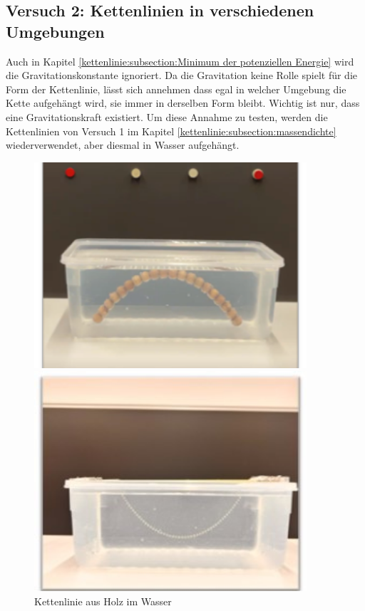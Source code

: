 \subsection{Versuch 2: Kettenlinien in verschiedenen Umgebungen
\label{kettenlinie:subsection:umgebung}}
Auch in Kapitel \ref{kettenlinie:subsection:Minimum der potenziellen Energie} wird die Gravitationskonstante ignoriert.
Da die Gravitation keine Rolle spielt für die Form der Kettenlinie, lässt sich annehmen dass egal in welcher Umgebung die Kette aufgehängt wird, sie immer in derselben Form bleibt.
Wichtig ist nur, dass eine Gravitationskraft existiert.
Um diese Annahme zu testen, werden die Kettenlinien von Versuch 1 im Kapitel \ref{kettenlinie:subsection:massendichte} wiederverwendet, aber diesmal in Wasser aufgehängt.

\begin{figure}
	\centering
	\begin{minipage}{0.45\textwidth}
		\centering
		\includegraphics[width=0.9\textwidth]{papers/kettenlinie/images/kettenlinie_holz_wasser.png}
		\caption{Kettenlinie aus Holz im Wasser}
		\label{fig:Kettenlinie-Holz-Wasser}
	\end{minipage}\hfill
	\begin{minipage}{0.45\textwidth}
		\centering
		\includegraphics[width=0.9\textwidth]{papers/kettenlinie/images/kettenlinie_metall_wasser.jpg}

\end{minipage}
\end{figure}
